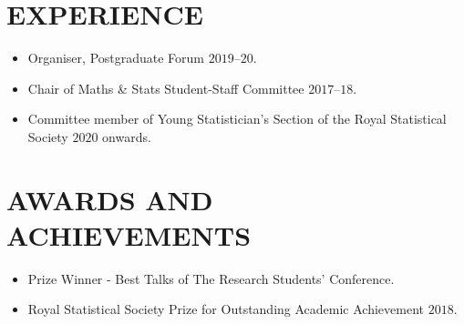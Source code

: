 \documentclass[11pt,a4paper,roman]{moderncv}        %
\begin{document}
\section{EXPERIENCE}
\begin{minipage}{\maincolumnwidth}%
	\small{
    	\begin{itemize}
	  \item {Organiser, Postgraduate Forum $2019$--$20$. \vspace{0.1cm}}
          \item {Chair of Maths \& Stats Student-Staff Committee $2017$--$18$. \vspace{0.1cm}}
            \item{Committee member of Young Statistician's Section of the Royal Statistical Society  $2020$ onwards. \vspace{0.1cm}}
		\end{itemize}}
\end{minipage}%

\section{AWARDS AND ACHIEVEMENTS}
\begin{minipage}{\maincolumnwidth}%
	\small{
    	\begin{itemize}
	  \item {Prize Winner - Best Talks of The Research Students' Conference. \vspace{0.1cm}}
          \item {Royal Statistical Society Prize for Outstanding Academic Achievement $2018$.  \vspace{0.1cm}}

	\end{itemize}
	}
\end{minipage}%


\nocite{*}



\end{document}
